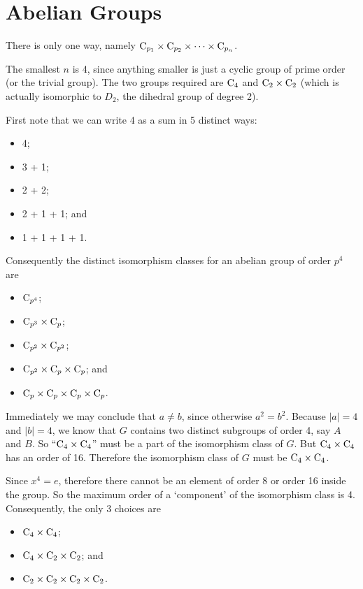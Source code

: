 \section{Abelian Groups}
\begin{questions}
    \item There is only one way, namely $\mathrm{C}_{p_1}\times\mathrm{C}_{p_2}\times\cdots\times\mathrm{C}_{p_n}$.
    
    \item The smallest $n$ is 4, since anything smaller is just a cyclic group of prime order (or the trivial group). The two groups required are $\mathrm{C}_{4}$ and $\mathrm{C}_{2} \times \mathrm{C}_{2}$ (which is actually isomorphic to $D_2$, the dihedral group of degree 2).
    
    \item First note that we can write 4 as a sum in 5 distinct ways:
    \begin{itemize}
        \item 4;
        \item 3 + 1;
        \item 2 + 2;
        \item 2 + 1 + 1; and
        \item 1 + 1 + 1 + 1.
    \end{itemize}
    Consequently the distinct isomorphism classes for an abelian group of order $p^4$ are
    \begin{itemize}
        \item $\mathrm{C}_{p^4}$;
        \item $\mathrm{C}_{p^3}\times\mathrm{C}_{p}$;
        \item $\mathrm{C}_{p^2}\times\mathrm{C}_{p^2}$;
        \item $\mathrm{C}_{p^2}\times\mathrm{C}_{p}\times\mathrm{C}_{p}$; and
        \item $\mathrm{C}_{p}\times\mathrm{C}_{p}\times\mathrm{C}_{p}\times\mathrm{C}_{p}$.
    \end{itemize}

    \item Immediately we may conclude that $a \neq b$, since otherwise $a^2 = b^2$. Because $|a| = 4$ and $|b| = 4$, we know that $G$ contains two distinct subgroups of order 4, say $A$ and $B$. So ``$\mathrm{C}_{4} \times \mathrm{C}_{4}$'' must be a part of the isomorphism class of $G$. But $\mathrm{C}_{4} \times \mathrm{C}_{4}$ has an order of 16. Therefore the isomorphism class of $G$ must be $\mathrm{C}_{4} \times \mathrm{C}_{4}$.
    
    \item Since $x^4 = e$, therefore there cannot be an element of order 8 or order 16 inside the group. So the maximum order of a `component' of the isomorphism class is 4. Consequently, the only 3 choices are
    \begin{itemize}
        \item $\mathrm{C}_{4}\times\mathrm{C}_{4}$;
        \item $\mathrm{C}_{4}\times\mathrm{C}_{2}\times\mathrm{C}_{2}$; and
        \item $\mathrm{C}_{2}\times\mathrm{C}_{2}\times\mathrm{C}_{2}\times\mathrm{C}_{2}$.
    \end{itemize}
\end{questions}

